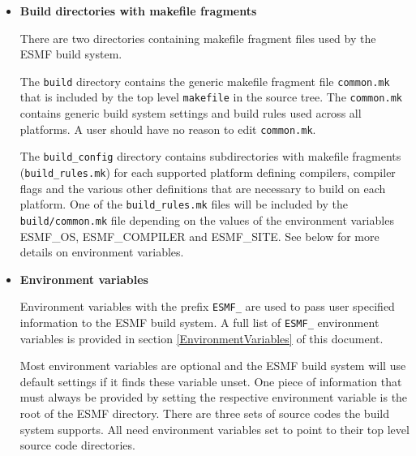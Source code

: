 \label{sec:BuildOptions}
\begin{itemize}
\item{{\bf Build directories with makefile fragments}}

There are two directories containing makefile fragment files used by
the ESMF build system.  

The {\tt build} directory contains the generic makefile fragment file
{\tt common.mk} that is included by the top level {\tt makefile} in the source
tree. The {\tt common.mk} contains generic build system settings and build
rules used across all platforms.  A user should have no reason to edit
{\tt common.mk}.

The {\tt build\_config} directory contains subdirectories with makefile
fragments ({\tt build\_rules.mk}) for each supported platform defining
compilers, compiler flags and the various other definitions that are
necessary to build on each platform. One of the {\tt build\_rules.mk} files
will be included by the {\tt build/common.mk} file depending on the values of
the environment variables ESMF\_OS, ESMF\_COMPILER and ESMF\_SITE. See below
for more details on environment variables.

\item{{\bf Environment variables}}

Environment variables with the prefix {\tt ESMF\_} are used to pass user
specified information to the ESMF build system. A full list of {\tt ESMF\_}
environment variables is provided in section \ref{EnvironmentVariables} of this
document.

Most environment variables are optional and the ESMF build system will use
default settings if it finds these variable unset. One piece of information that
must always be provided by setting the respective environment variable is the
root of the ESMF directory. There are three sets of source codes the build
system supports. All need environment variables set to point to their top 
level source code directories.

\end{itemize}
